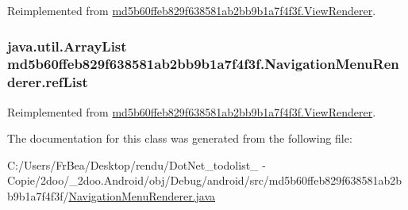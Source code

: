 Reimplemented from \hyperlink{classmd5b60ffeb829f638581ab2bb9b1a7f4f3f_1_1_view_renderer_9d61e0ff54f2c1a789912ef2d2e97d9d}{md5b60ffeb829f638581ab2bb9b1a7f4f3f.ViewRenderer}.\hypertarget{classmd5b60ffeb829f638581ab2bb9b1a7f4f3f_1_1_navigation_menu_renderer_717e3e89de8a97cac2daee362f553abe}{
\subsubsection[{refList}]{\setlength{\rightskip}{0pt plus 5cm}java.util.ArrayList {\bf md5b60ffeb829f638581ab2bb9b1a7f4f3f.NavigationMenuRenderer.refList}}}
\label{classmd5b60ffeb829f638581ab2bb9b1a7f4f3f_1_1_navigation_menu_renderer_717e3e89de8a97cac2daee362f553abe}




Reimplemented from \hyperlink{classmd5b60ffeb829f638581ab2bb9b1a7f4f3f_1_1_view_renderer_0833259dc6ac4a65396cf7f3fedd9f17}{md5b60ffeb829f638581ab2bb9b1a7f4f3f.ViewRenderer}.

The documentation for this class was generated from the following file:\begin{CompactItemize}
\item 
C:/Users/FrBea/Desktop/rendu/DotNet\_\-todolist\_ - Copie/2doo/\_\-2doo.Android/obj/Debug/android/src/md5b60ffeb829f638581ab2bb9b1a7f4f3f/\hyperlink{_navigation_menu_renderer_8java}{NavigationMenuRenderer.java}\end{CompactItemize}
